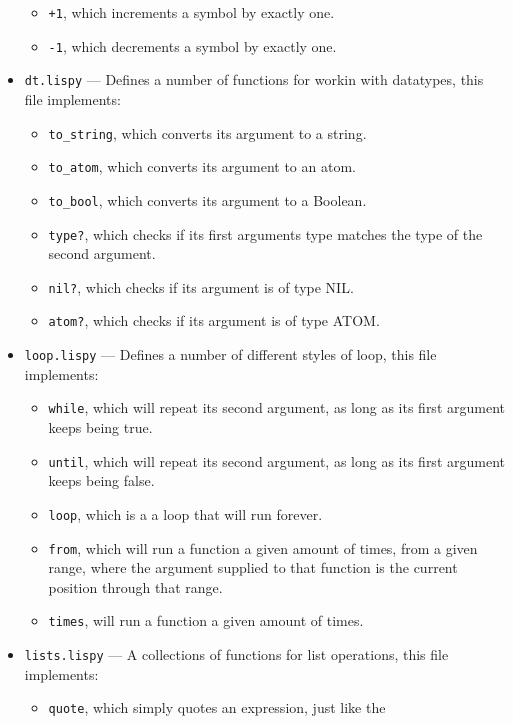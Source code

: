 \documentclass{article}
\newcommand{\code}[1]{\texttt{#1}}
\begin{document}
\begin{itemize}
\begin{itemize}
          \item \code{+1}, which increments a symbol by exactly one.
          \item \code{-1}, which decrements a symbol by exactly one.
        \end{itemize}
      \item \code{dt.lispy} --- Defines a number of functions for workin with
      datatypes, this file implements:
        \begin{itemize}
          \item \code{to\_string}, which converts its argument to a string.
          \item \code{to\_atom}, which converts its argument to an atom.
          \item \code{to\_bool}, which converts its argument to a Boolean.
          \item \code{type?}, which checks if its first arguments type matches
          the type of the second argument.
          \item \code{nil?}, which checks if its argument is of type NIL.
          \item \code{atom?}, which checks if its argument is of type ATOM.
        \end{itemize}
      \item \code{loop.lispy} --- Defines a number of different styles of loop,
      this file implements:
        \begin{itemize}
          \item \code{while}, which will repeat its second argument, as long
          as its first argument keeps being true.
          \item \code{until}, which will repeat its second argument, as long
          as its first argument keeps being false.
          \item \code{loop}, which is a a loop that will run forever.
          \item \code{from}, which will run a function a given amount of times,
          from a given range, where the argument supplied to that function is
          the current position through that range.
          \item \code{times}, will run a function a given amount of times.
        \end{itemize}
      \item \code{lists.lispy} --- A collections of functions for list operations,
      this file implements:
        \begin{itemize}
          \item \code{quote}, which simply quotes an expression, just like the

\end{itemize}
\end{itemize}
\end{document}

